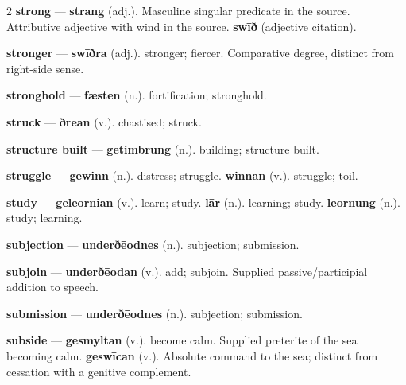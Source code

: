 \begin{multicols}{2}
\textbf{strong} — \textbf{strang} (adj.). Masculine singular predicate in the source. Attributive adjective with wind in the source. \textbf{swīð} (adjective citation).\par
\textbf{stronger} — \textbf{swīðra} (adj.). stronger; fiercer. Comparative degree, distinct from right-side sense.\par
\textbf{stronghold} — \textbf{fæsten} (n.). fortification; stronghold.\par
\textbf{struck} — \textbf{ðrēan} (v.). chastised; struck.\par
\textbf{structure built} — \textbf{getimbrung} (n.). building; structure built.\par
\textbf{struggle} — \textbf{gewinn} (n.). distress; struggle. \textbf{winnan} (v.). struggle; toil.\par
\textbf{study} — \textbf{geleornian} (v.). learn; study. \textbf{lār} (n.). learning; study. \textbf{leornung} (n.). study; learning.\par
\textbf{subjection} — \textbf{underðēodnes} (n.). subjection; submission.\par
\textbf{subjoin} — \textbf{underðēodan} (v.). add; subjoin. Supplied passive/participial addition to speech.\par
\textbf{submission} — \textbf{underðēodnes} (n.). subjection; submission.\par
\textbf{subside} — \textbf{gesmyltan} (v.). become calm. Supplied preterite of the sea becoming calm. \textbf{geswīcan} (v.). Absolute command to the sea; distinct from cessation with a genitive complement.\par

\end{multicols}
